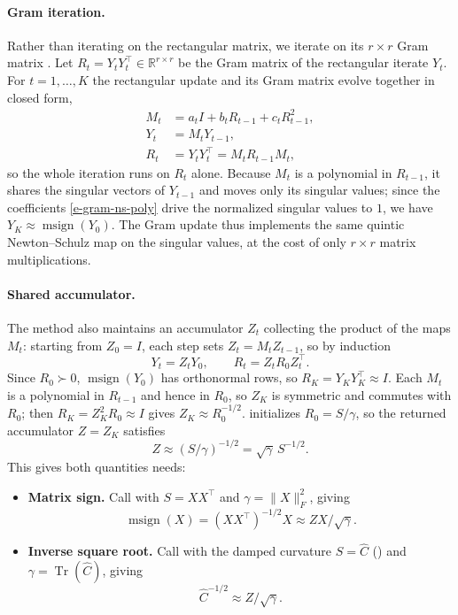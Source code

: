 \documentclass[11pt]{article}
\DeclareMathOperator{\Tr}{Tr}
\DeclareMathOperator{\msign}{msign}          %
\newcommand{\norm}[1]{\| #1\|}
\theoremstyle{plain}
\theoremstyle{definition}
\theoremstyle{remark}
\theoremstyle{definition}
\begin{document}
\paragraph{Gram iteration.}
Rather than iterating on the rectangular matrix, we iterate on its $r\times r$
Gram matrix \cite{gram_ns}.  Let $R_t = Y_t Y_t^\top \in \mathbb{R}^{r\times r}$
be the Gram matrix of the rectangular iterate $Y_t$.  For $t=1,\dots,K$ the
rectangular update and its Gram matrix evolve together in closed form,
\[
\begin{aligned}
    M_t &= a_t I + b_t R_{t-1} + c_t R_{t-1}^2, \\
    Y_t &= M_t Y_{t-1}, \\
    R_t &= Y_tY_t^\top = M_t R_{t-1} M_t ,
\end{aligned}
\]
so the whole iteration runs on $R_t$ alone.  Because $M_t$ is a polynomial in
$R_{t-1}$, it shares the singular vectors of $Y_{t-1}$ and moves only its
singular values; since the coefficients \eqref{e-gram-ns-poly} drive the
normalized singular values to $1$, we have $Y_K \approx \msign(Y_0)$.  The Gram update thus
implements the same quintic Newton--Schulz map on the singular values, at the
cost of only $r\times r$ matrix multiplications.

\paragraph{Shared accumulator.}
The method also maintains an accumulator $Z_t$ collecting the product of the
maps $M_t$: starting from $Z_0=I$, each step sets $Z_t=M_t Z_{t-1}$, so by
induction
\[
    Y_t=Z_tY_0,
    \qquad
    R_t=Z_tR_0Z_t^\top .
\]
Since $R_0\succ0$, $\msign(Y_0)$ has orthonormal rows, so
$R_K=Y_KY_K^\top\approx I$.  Each $M_t$ is a polynomial in $R_{t-1}$ and
hence in $R_0$, so $Z_K$ is symmetric and commutes with $R_0$; then
$R_K=Z_K^2R_0\approx I$ gives $Z_K\approx R_0^{-1/2}$.
 initializes $R_0=S/\gamma$, so the returned accumulator
$Z=Z_K$ satisfies
\[
    Z\approx(S/\gamma)^{-1/2}=\sqrt{\gamma}\,S^{-1/2}.
\]
This gives both quantities  needs:

\begin{itemize}[leftmargin=1.5em,itemsep=2pt,topsep=2pt]
    \item \textbf{Matrix sign.}
    Call  with $S=XX^\top$ and $\gamma=\norm{X}_F^2$, giving
    \[
        \msign(X)=(XX^\top)^{-1/2}X\approx ZX/\sqrt{\gamma}.
    \]
    \item \textbf{Inverse square root.}
    Call  with the damped curvature $S=\widehat{C}$
    () and $\gamma=\Tr(\widehat{C})$, giving
    \[
        \widehat{C}^{-1/2}\approx Z/\sqrt{\gamma}.
    \]
\end{itemize}
\end{document}
